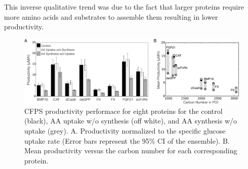 \documentclass[journal=asbcd6,manuscript=article]{achemso}
\begin{document}
This inverse qualitative trend was due to the fact that larger proteins require more amino acids and substrates to assemble them resulting in lower productivity. 
\begin{figure}[t!]
\centering
\includegraphics[width=1.00\textwidth]{./Figures/Prod_POI.pdf}
\caption{CFPS productivity performace for eight proteins for the control (black), AA uptake w/o synthesis (off white), and AA synthesis w/o uptake (grey). A. Productivity normalized to the specific glucose uptake rate (Error bars represent the 95\% CI of the ensemble). B. Mean productivity versus the carbon number for each corresponding protein.}
\label{fig:Prod_POI}
\end{figure}
\end{document}
